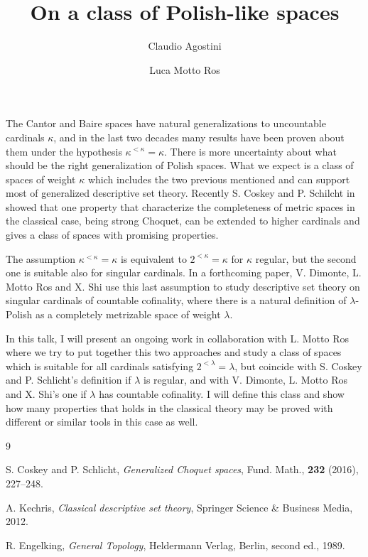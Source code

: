 \documentclass{amsart}
\title{On a class of Polish-like spaces}
\author{Claudio Agostini}
\author{Luca Motto Ros}
\begin{document}
\maketitle


The Cantor and Baire spaces have natural generalizations to uncountable cardinals $\kappa$, and in the last two decades many results have been proven about them under the hypothesis $\kappa^{<\kappa}=\kappa$. There is more uncertainty about what should be the right generalization of Polish spaces. What we expect is a class of spaces of weight $\kappa$ which includes the two previous mentioned and can support most of generalized descriptive set theory.
Recently S. Coskey and P. Schilcht in \cite{CosSch} showed that one property that characterize the completeness of metric spaces in the classical case, being strong Choquet, can be extended to higher cardinals and gives a class of spaces with promising properties. 


The assumption $\kappa^{<\kappa}=\kappa$ is equivalent to $2^{<\kappa}=\kappa$ for $\kappa$ regular, but the second one is suitable also for singular cardinals. 
In a forthcoming paper, V. Dimonte, L. Motto Ros and X. Shi use this last assumption to study descriptive set theory on singular cardinals of countable cofinality, where there is a natural definition of $\lambda$-Polish as a completely metrizable space of weight $\lambda$. 

In this talk, I will present an ongoing work in collaboration with L. Motto Ros where we try to put together this two approaches and study a class of spaces which is suitable for all cardinals satisfying $2^{<\lambda}=\lambda$, but coincide with S. Coskey and P. Schlicht's definition if $\lambda$ is regular, and with V. Dimonte, L. Motto Ros and X. Shi's one if $\lambda$ has countable cofinality. I will define this class and show how many properties that holds in the classical theory may be proved with different or similar tools in this case as well.  

\begin{thebibliography} {9}

 S. Coskey and P. Schlicht, \emph{Generalized Choquet spaces}, Fund. Math., \textbf{232} (2016), 227--248.

 A. Kechris, \emph{Classical descriptive set theory}, Springer Science \& Business Media, 2012.
 
 R. Engelking, \emph{General Topology}, Heldermann Verlag, Berlin, second ed., 1989.
 
\end{thebibliography}
\end{document}
